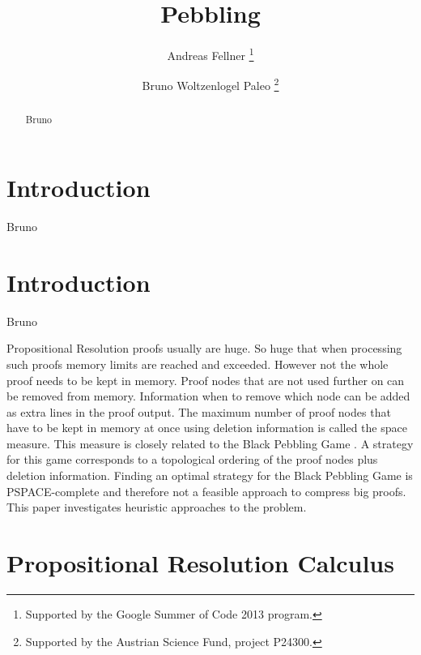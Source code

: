 \documentclass{llncs}
\title{Pebbling}
\author{
  Andreas Fellner\inst{1}
  \thanks{Supported by the Google Summer of Code 2013 program.}
  \and 
  Bruno Woltzenlogel Paleo\inst{2}
  \thanks{Supported by the Austrian Science Fund, project P24300.}
}
\institute{
  Vienna University of Technology \\
  \email{fellner.a@gmail.com}
  \and 
  Vienna University of Technology \\
  \email{bruno@logic.at}
}
\begin{document}
\maketitle


\begin{abstract}
Bruno
\end{abstract}

\setcounter{footnote}{0}

\section{Introduction}

Bruno

\section{Introduction}
Bruno

Propositional Resolution proofs usually are huge. So huge that when processing such proofs memory limits are reached and exceeded.
However not the whole proof needs to be kept in memory. 
Proof nodes that are not used further on can be removed from memory.
Information when to remove which node can be added as extra lines in the proof output.
The maximum number of proof nodes that have to be kept in memory at once using deletion information is called the space measure.
This measure is closely related to the Black Pebbling Game \cite{kasai1979classes,gilbert1980pebbling}.
A strategy for this game corresponds to a topological ordering of the proof nodes plus deletion information.
Finding an optimal strategy for the Black Pebbling Game is PSPACE-complete \cite{gilbert1980pebbling} and therefore not a feasible approach to compress big proofs.
This paper investigates heuristic approaches to the problem.

\section{Propositional Resolution Calculus}
\end{document}
